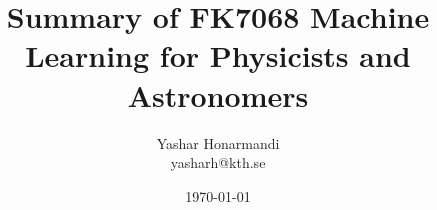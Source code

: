 \documentclass[a4paper, 11pt]{article}
\title{Summary of FK7068 Machine Learning for Physicists and Astronomers}
\author{Yashar Honarmandi \\ yasharh@kth.se}
\date{\today}
\begin{document}
\maketitle

\begin{abstract}
	
\end{abstract}

\thispagestyle{empty}

\newpage

\tableofcontents

\newpage











\end{document}
